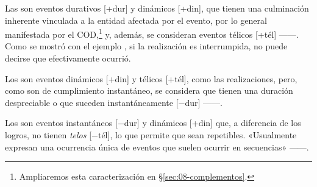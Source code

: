Las  son eventos durativos [+dur] y dinámicos [+din], que
tienen una culminación inherente vinculada a la entidad afectada por el evento,
por lo general manifestada por el COD,\footnote{Ampliaremos esta caracterización
en §\ref{sec:08-complementos}.} y, además, se consideran eventos télicos [+tél]
------. Como se
mostró con el ejemplo , si la realización es
interrumpida, no puede decirse que efectivamente ocurrió.

Los  son eventos dinámicos [+din] y télicos [+tél], como las
realizaciones, pero, como son de cumplimiento instantáneo, se considera que
tienen una duración despreciable o que suceden instantáneamente [$-$dur]
------.

Los  son eventos instantáneos [$-$dur] y dinámicos
[+din] que, a diferencia de los logros, no tienen \textit{telos} [$-$tél], lo
que permite que sean repetibles. «Usualmente expresan una ocurrencia única de
eventos que suelen ocurrir en secuencias» \parencite[161]{pustejovsky2019}
------.

